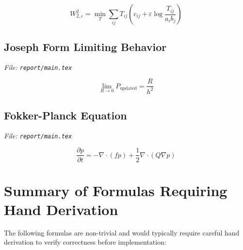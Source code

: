 \documentclass[12pt]{article}
\begin{document}
\begin{equation}
W_{2,\varepsilon}^2 = \min_T \sum_{ij} T_{ij} \left( c_{ij} + \varepsilon \log\frac{T_{ij}}{a_i b_j} \right)
\end{equation}

\subsection{Joseph Form Limiting Behavior}
\textit{File: \texttt{report/main.tex}}

\begin{equation}
\lim_{R \to 0} P_{\text{updated}} = \frac{R}{h^2}
\end{equation}

\subsection{Fokker-Planck Equation}
\textit{File: \texttt{report/main.tex}}

\begin{equation}
\frac{\partial p}{\partial t} = -\nabla \cdot (f p) + \frac{1}{2} \nabla \cdot (Q \nabla p)
\end{equation}

\section{Summary of Formulas Requiring Hand Derivation}

The following formulas are non-trivial and would typically require careful hand derivation to verify correctness before implementation:
\end{document}
